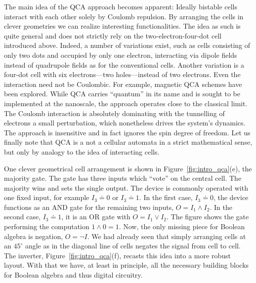 The main idea of the QCA approach becomes apparent: Ideally bistable cells
interact with each other solely by Coulomb repulsion. By arranging the cells in
clever geometries we can realize interesting functionalities. The idea as such
is quite general and does not strictly rely on the two-electron-four-dot cell
introduced above. Indeed, a number of variations exist, such as cells consisting
of only two dots and occupied by only one electron, interacting via dipole
fields instead of quadrupole fields as for the conventional cells. Another
variation is a four-dot cell with six electrons---two holes---instead of two
electrons. Even the interaction need not be Coulombic. For example, magnetic QCA
schemes have been explored. While QCA carries ``quantum'' in its name and is
sought to be implemented at the nanoscale, the approach operates close to the
classical limit. The Coulomb interaction is absolutely dominating with the
tunnelling of electrons a small perturbation, which nonetheless drives the
system's dynamics.  The approach is insensitive and in fact ignores the spin
degree of freedom. Let us finally note that QCA is a not a cellular automata in
a strict mathematical sense, but only by analogy to the idea of interacting
cells.

One clever geometrical cell arrangement is shown in
Figure~\ref{fig:intro_qca}(e), the majority gate. The gate has three inputs
which ``vote'' on the central cell. The majority wins and sets the single
output. The device is commonly operated with one fixed input, for example $I_3
\doteq 0$ or $I_3 \doteq 1$. In the first case, $I_3 \doteq 0$, the device
functions as an AND gate for the remaining two inputs, $O = I_1 \land I_2$. In
the second case, $I_3 \doteq 1$, it is an OR gate with $O = I_1 \lor I_2$. The
figure shows the gate performing the computation $1 \land 0 = 1$. Now, the only
missing piece for Boolean algebra is negation, $O = \lnot I$. We had already
seen that simply arranging cells at an $45^{\circ}$ angle as in the diagonal
line of cells negates the signal from cell to cell. The inverter,
Figure~\ref{fig:intro_qca}(f), recasts this idea into a more robust layout. With
that we have, at least in principle, all the necessary building blocks for
Boolean algebra and thus digital circuitry.

